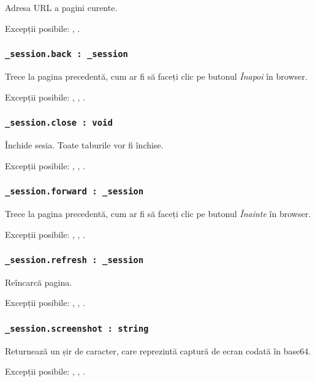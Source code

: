 Adresa URL a pagini curente.

Excepții posibile: , .

\subsubsection{\lstinline|_session.back : _session|}

Trece la pagina precedentă, cum ar fi să faceți clic pe butonul \textit{Înapoi} în browser.

Excepții posibile: , , .

\subsubsection{\lstinline|_session.close : void|}

Închide sesia. Toate taburile vor fi închise.

Excepții posibile: , , .

\subsubsection{\lstinline|_session.forward : _session|}

Trece la pagina precedentă, cum ar fi să faceți clic pe butonul \textit{Înainte} în browser.

Excepții posibile: , , .

\subsubsection{\lstinline|_session.refresh : _session|}

Reîncarcă pagina.

Excepții posibile: , , .

\subsubsection{\lstinline|_session.screenshot : string|}

Returnează un șir de caracter, care reprezintă captură de ecran codată în base64.

Excepții posibile: , , .

